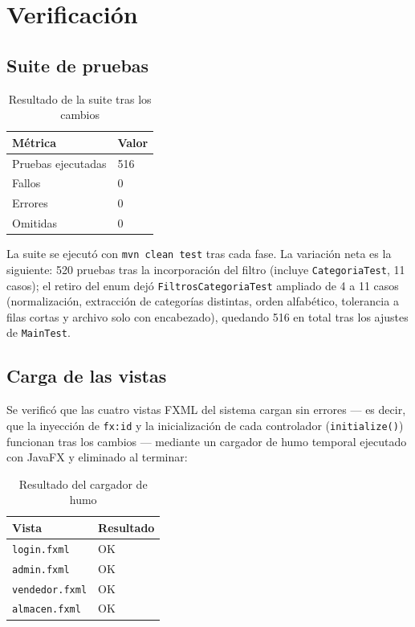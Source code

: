 \chapter{Verificación}

\section{Suite de pruebas}
\begin{table}[H]\centering\caption{Resultado de la suite tras los cambios}
\begin{tabular}{ll}\toprule
Métrica & Valor\\\midrule
Pruebas ejecutadas & 516\\
Fallos & 0\\
Errores & 0\\
Omitidas & 0\\\bottomrule
\end{tabular}\end{table}

La suite se ejecutó con \texttt{mvn clean test} tras cada fase. La variación neta es la siguiente: 520 pruebas tras la incorporación del filtro (incluye \texttt{CategoriaTest}, 11 casos); el retiro del enum dejó \texttt{FiltrosCategoriaTest} ampliado de 4 a 11 casos (normalización, extracción de categorías distintas, orden alfabético, tolerancia a filas cortas y archivo solo con encabezado), quedando 516 en total tras los ajustes de \texttt{MainTest}.

\section{Carga de las vistas}
Se verificó que las cuatro vistas FXML del sistema cargan sin errores — es decir, que la inyección de \texttt{fx:id} y la inicialización de cada controlador (\texttt{initialize()}) funcionan tras los cambios — mediante un cargador de humo temporal ejecutado con JavaFX y eliminado al terminar:

\begin{table}[H]\centering\caption{Resultado del cargador de humo}
\begin{tabular}{ll}\toprule
Vista & Resultado\\\midrule
\texttt{login.fxml} & OK\\
\texttt{admin.fxml} & OK\\
\texttt{vendedor.fxml} & OK\\
\texttt{almacen.fxml} & OK\\\bottomrule
\end{tabular}\end{table}

